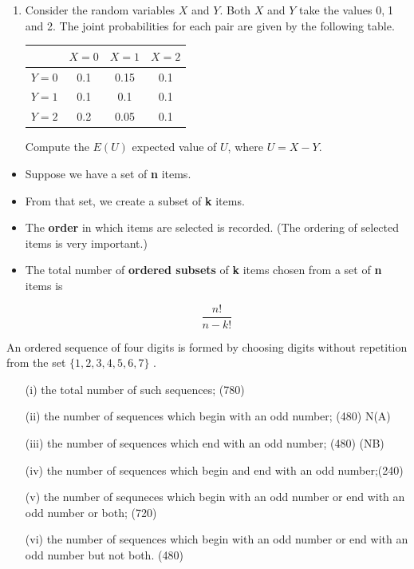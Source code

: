 \documentclass[12pt]{report}
\begin{document}
{{\begin{enumerate}
	\begin{itemize}
		\item[(a)] The random variable takes just one other value besides 2 and 3. This value is greater than 0. What is this value?
		\item[(b)] What is the variance of $X$?
	\end{itemize}
	
	
	\item Consider the random variables $X$ and $Y$. Both $X$ and $Y$ take the values 0,$\;$1 and 2. 
	The joint probabilities for each pair are given by the following table.
	\begin{center}
		\begin{tabular}{|c|c|c|c|}
			\hline  & $X=0$ & $X=1$ & $X=2$ \\ 
			\hline $Y=0$ & 0.1 & 0.15 & 0.1 \\ 
			\hline $Y=1$ & 0.1 & 0.1 & 0.1 \\ 
			\hline $Y=2$ & 0.2 & 0.05 & 0.1 \\ 
			\hline 
		\end{tabular} 
	\end{center}
	Compute the $E(U)$ expected value of $U$, where $U=X-Y$.
\end{enumerate}
\newpage
{\Large
	\begin{itemize}
		
		\item Suppose we have a set of \textbf{n} items.
		\item From that set, we create a subset of \textbf{k} items.
		\item The \textbf{order} in which items are selected is recorded. (The ordering of selected items is very important.) 
		\item The total number of \textbf{ordered subsets} of \textbf{k} items chosen from a set of \textbf{n} items is
		
		\[\frac{n!}{n-k!}\]
	\end{itemize}
}


An ordered sequence of four digits is formed by choosing digits without
repetition from the set $\{1, 2, 3, 4, 5, 6, 7\}$ .

\begin{itemize}
	\item[(i)] the total number of such sequences; (780)
	\item[(ii)] the number of sequences which begin with an odd number; (480) N(A)
	\item[(iii)] the number of sequences which end with an odd number; (480) (NB)
	\item[(iv)] the number of sequences which begin and end with an odd number;(240)
	\item[(v)] the number of sequneces which begin with an odd number or end with an
	odd number or both; (720)
	\item[(vi)] the number of sequences which begin with an odd number or end with an
	odd number but not both. (480)
\end{itemize}

}}
\end{document}
